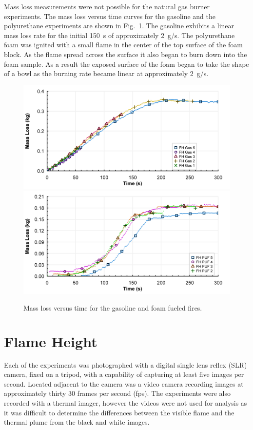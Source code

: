 \documentclass[twoside]{uocthesis}
\begin{document}
{{Mass loss measurements were not possible for the natural gas burner experiments.  The mass loss versus time curves for the gasoline and the polyurethane experiments are shown in Fig.~\ref{Mass}.  The gasoline exhibits a linear mass loss rate for the initial 150~s of approximately 2~g/s.  The polyurethane foam was ignited with a small flame in the center of the top surface of the foam block.  As the flame spread across the surface it also began to burn down into the foam sample.  As a result the exposed surface of the foam began to take the shape of a bowl as the burning rate became linear at approximately 2~g/s.

\begin{figure}[p]
  \centering
  \includegraphics[width=4.5in]{../Figures/Fig12}\\
  \includegraphics[width=4.5in]{../Figures/Fig13}\\
  \caption[Mass loss versus time for the gasoline and foam fueled fires]{Mass loss versus time for the gasoline and foam fueled fires.}
  \label{Mass}
\end{figure}


\section{Flame Height}

Each of the experiments was photographed with a digital single lens reflex (SLR) camera, fixed on a tripod, with a capability of capturing at least five images per second.  Located adjacent to the camera was a video camera recording images at approximately thirty 30 frames per second (fps).  The experiments were also recorded with a thermal imager, however the videos were not used for analysis as it was difficult to determine the differences between the visible flame and the thermal plume from the black and white images.

}}
\end{document}
